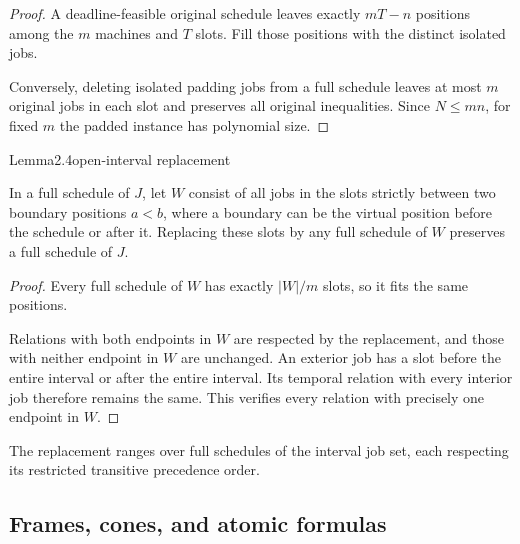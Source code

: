 \begin{proof}
A deadline-feasible original schedule leaves exactly \(mT-n\) positions among the \(m\) machines and \(T\) slots. Fill those positions with the distinct isolated jobs.

Conversely, deleting isolated padding jobs from a full schedule leaves at most \(m\) original jobs in each slot and preserves all original inequalities. Since \(N\leq mn\), for fixed \(m\) the padded instance has polynomial size.
\end{proof}

\begin{numbered}{Lemma}{2.4}{open-interval replacement}

In a full schedule of \(J\), let \(W\) consist of all jobs in the slots strictly between two boundary positions \(a<b\), where a boundary can be the virtual position before the schedule or after it. Replacing these slots by any full schedule of \(W\) preserves a full schedule of \(J\).

\end{numbered}

\begin{proof}
Every full schedule of \(W\) has exactly \(|W|/m\) slots, so it fits the same positions.

Relations with both endpoints in \(W\) are respected by the replacement, and those with neither endpoint in \(W\) are unchanged. An exterior job has a slot before the entire interval or after the entire interval. Its temporal relation with every interior job therefore remains the same. This verifies every relation with precisely one endpoint in \(W\).
\end{proof}

The replacement ranges over full schedules of the interval job set, each respecting its restricted transitive precedence order.

\subsection{Frames, cones, and atomic formulas}

